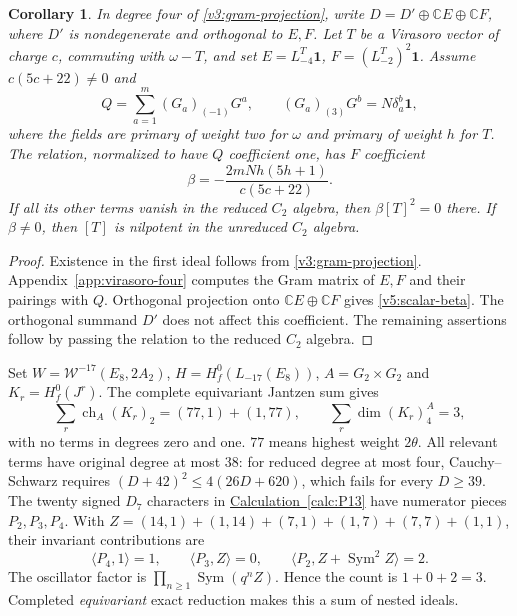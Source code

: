 \documentclass[11pt,a4paper]{amsart}
\numberwithin{equation}{section}
\newtheorem{corollary}[theorem]{Corollary}
\theoremstyle{definition}
\theoremstyle{remark}
\newcommand{\C}{\mathbb C}
\newcommand{\ch}{\operatorname{ch}}
\newcommand{\Sym}{\operatorname{Sym}}
\begin{document}
\begin{corollary}
\label{v5:scalar-coefficient}
In degree four of \cref{v3:gram-projection}, write
$D=D'\oplus\C E\oplus\C F$, where $D'$ is nondegenerate and
orthogonal to $E,F$. Let $T$ be a Virasoro vector of charge $c$,
commuting with $\omega-T$, and set
$E=L^T_{-4}\mathbf1$, $F=(L^T_{-2})^2\mathbf1$.
Assume $c(5c+22)\ne0$ and
$$
 Q=\sum_{a=1}^m(G_a)_{(-1)}G^a,\qquad
 (G_a)_{(3)}G^b=N\delta_a^b\mathbf1,
$$
where the fields are primary of weight two for $\omega$ and primary
of weight $h$ for $T$. The relation, normalized to have $Q$ coefficient
one, has $F$ coefficient
\begin{equation}\label{v5:scalar-beta}
 \beta=-\frac{2mNh(5h+1)}{c(5c+22)}.
\end{equation}
If all its other terms vanish in the reduced $C_2$ algebra, then
$\beta[T]^2=0$ there. If $\beta\ne0$, then $[T]$ is nilpotent
in the unreduced $C_2$ algebra.
\end{corollary}
\begin{proof}
Existence in the first ideal follows from
\cref{v3:gram-projection}. Appendix~\ref{app:virasoro-four} computes the Gram matrix of
$E,F$ and their pairings with $Q$. Orthogonal projection onto
$\C E\oplus\C F$ gives \eqref{v5:scalar-beta}. The orthogonal
summand $D'$ does not affect this coefficient. The remaining
assertions follow by passing the relation to the reduced $C_2$ algebra.
\end{proof}

Set $W=\mathcal W^{-17}(E_8,2A_2)$, $H=H_f^0(L_{-17}(E_8))$,
$A=G_2\times G_2$ and $K_r=H_f^0(J^r)$. The complete equivariant
Jantzen sum gives
\begin{equation}\label{exc:p13-count}
 \sum_r\ch_A(K_r)_2=(77,1)+(1,77),\qquad
 \sum_r\dim(K_r)_4^A=3,
\end{equation}
with no terms in degrees zero and one. $77$ means highest weight
$2\theta$. All relevant terms have original degree at most $38$: for reduced degree at
most four, Cauchy--Schwarz requires
$(D+42)^2\le4(26D+620)$, which fails for every $D\ge39$.
The twenty signed $D_7$ characters in \hyperref[calc:P13]{Calculation~\ref*{calc:P13}} have
numerator pieces $P_2,P_3,P_4$. With
$Z=(14,1)+(1,14)+(7,1)+(1,7)+(7,7)+(1,1)$, their invariant contributions
are
$$
 \langle P_4,1\rangle=1,\qquad \langle P_3,Z\rangle=0,\qquad
 \langle P_2,Z+\Sym^2Z\rangle=2.
$$
The oscillator factor is $\prod_{n\ge1}\Sym(q^nZ)$. Hence the count is
$1+0+2=3$. Completed \emph{equivariant} exact reduction makes this a
sum of nested ideals.
\end{document}
